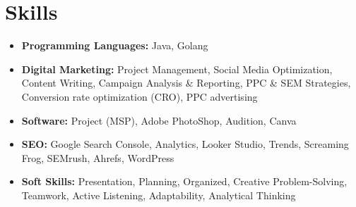 \documentclass[11pt,a4paper,sans]{moderncv}
\begin{document}
\section{Skills}
{\begin{itemize}[label=\textbullet]
\item {\textbf{Programming Languages:} Java, Golang}
\item {\textbf{Digital Marketing:} Project Management, Social Media Optimization, Content Writing, Campaign Analysis \& Reporting, PPC \& SEM Strategies, Conversion rate optimization (CRO), PPC advertising}
\item {\textbf{Software:} Project (MSP), Adobe PhotoShop, Audition, Canva}
\item {\textbf{SEO:} Google Search Console, Analytics, Looker Studio, Trends, Screaming Frog, SEMrush, Ahrefs, WordPress}
\item {\textbf{Soft Skills:} Presentation, Planning, Organized, Creative Problem-Solving, Teamwork, Active Listening, Adaptability, Analytical Thinking}
\end{itemize}}
\end{document}
